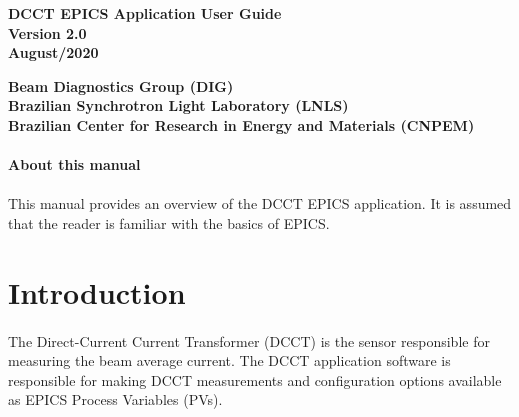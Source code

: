 \documentclass[openany]{article}
\begin{document}
\begin{titlepage}

\thispagestyle{fancy}

\begin{center}

\vspace*{\fill}
\textbf{\Huge DCCT EPICS Application User Guide}\\[20pt]
\textbf{\Huge Version 2.0}\\[20pt]
\textbf{\Huge August/2020}
\vspace*{\fill}

\vfill
\textbf{Beam Diagnostics Group (DIG)}\\[5pt]
\textbf{Brazilian Synchrotron Light Laboratory (LNLS)}\\[5pt]
\textbf{Brazilian Center for Research in Energy and Materials (CNPEM)}
\end{center}

\end{titlepage}

\newpage
\pagestyle{plain} %

\paragraph{}{\Large\bfseries About this manual}

\paragraph{} This manual provides an overview of the DCCT EPICS application. It is assumed that the reader is familiar with the basics of EPICS.

\tableofcontents

\newpage
\section{Introduction}

\paragraph{} The Direct-Current Current Transformer (DCCT) is the sensor responsible for measuring the beam average current. The DCCT application software is responsible for making DCCT measurements and configuration options available as EPICS Process Variables (PVs).
\end{document}
